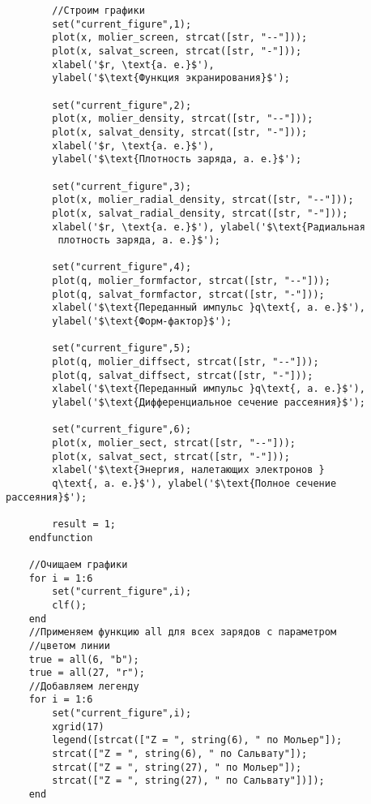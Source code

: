 \documentclass[a4paper,14pt]{extarticle} %
\begin{document}
\begin{verbatim}
	    //Строим графики
	    set("current_figure",1);
	    plot(x, molier_screen, strcat([str, "--"]));
	    plot(x, salvat_screen, strcat([str, "-"]));
	    xlabel('$r, \text{а. е.}$'), 
	    ylabel('$\text{Функция экранирования}$');
	    
	    set("current_figure",2);
	    plot(x, molier_density, strcat([str, "--"]));
	    plot(x, salvat_density, strcat([str, "-"]));
	    xlabel('$r, \text{а. е.}$'), 
	    ylabel('$\text{Плотность заряда, а. е.}$');
	    
	    set("current_figure",3);
	    plot(x, molier_radial_density, strcat([str, "--"]));
	    plot(x, salvat_radial_density, strcat([str, "-"]));
	    xlabel('$r, \text{а. е.}$'), ylabel('$\text{Радиальная
	     плотность заряда, а. е.}$');
	    
	    set("current_figure",4);
	    plot(q, molier_formfactor, strcat([str, "--"]));
	    plot(q, salvat_formfactor, strcat([str, "-"]));
	    xlabel('$\text{Переданный импульс }q\text{, а. е.}$'), 
	    ylabel('$\text{Форм-фактор}$');
	    
	    set("current_figure",5);
	    plot(q, molier_diffsect, strcat([str, "--"]));
	    plot(q, salvat_diffsect, strcat([str, "-"]));
	    xlabel('$\text{Переданный импульс }q\text{, а. е.}$'), 
	    ylabel('$\text{Дифференциальное сечение рассеяния}$');
	    
	    set("current_figure",6);
	    plot(x, molier_sect, strcat([str, "--"]));
	    plot(x, salvat_sect, strcat([str, "-"]));
	    xlabel('$\text{Энергия, налетающих электронов }
	    q\text{, а. е.}$'), ylabel('$\text{Полное сечение рассеяния}$');
	
	    result = 1;
	endfunction
	
	//Очищаем графики
	for i = 1:6
	    set("current_figure",i);
	    clf();
	end
	//Применяем функцию all для всех зарядов с параметром
	//цветом линии
	true = all(6, "b");
	true = all(27, "r");
	//Добавляем легенду
	for i = 1:6
	    set("current_figure",i);
	    xgrid(17)
	    legend([strcat(["Z = ", string(6), " по Мольер"]);
	    strcat(["Z = ", string(6), " по Сальвату"]); 
	    strcat(["Z = ", string(27), " по Мольер"]);
	    strcat(["Z = ", string(27), " по Сальвату"])]);
	end
\end{verbatim}
\end{document}
